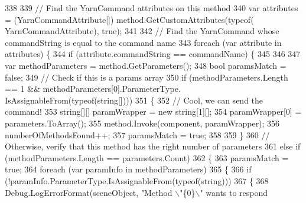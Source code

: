\begin{DoxyCode}
338 
339                     \textcolor{comment}{// Find the YarnCommand attributes on this method}
340                     var attributes = (YarnCommandAttribute[]) method.GetCustomAttributes(typeof(
      YarnCommandAttribute), \textcolor{keyword}{true});
341 
342                     \textcolor{comment}{// Find the YarnCommand whose commandString is equal to the command name}
343                     \textcolor{keywordflow}{foreach} (var attribute \textcolor{keywordflow}{in} attributes) \{
344                         \textcolor{keywordflow}{if} (attribute.commandString == commandName) \{
345 
346                             
347                             var methodParameters = method.GetParameters();
348                             \textcolor{keywordtype}{bool} paramsMatch = \textcolor{keyword}{false};
349                             \textcolor{comment}{// Check if this is a params array}
350                             \textcolor{keywordflow}{if} (methodParameters.Length == 1 && methodParameters[0].ParameterType.
      IsAssignableFrom(typeof(\textcolor{keywordtype}{string}[])))
351                                 \{
352                                     \textcolor{comment}{// Cool, we can send the command!}
353                                     \textcolor{keywordtype}{string}[][] paramWrapper = \textcolor{keyword}{new} \textcolor{keywordtype}{string}[1][];
354                                     paramWrapper[0] = parameters.ToArray();
355                                     method.Invoke(component, paramWrapper);
356                                     numberOfMethodsFound++;
357                                     paramsMatch = \textcolor{keyword}{true};
358                                 
359                             \}
360                             \textcolor{comment}{// Otherwise, verify that this method has the right number of parameters}
361                             \textcolor{keywordflow}{else} \textcolor{keywordflow}{if} (methodParameters.Length == parameters.Count)
362                             \{
363                                 paramsMatch = \textcolor{keyword}{true};
364                                 \textcolor{keywordflow}{foreach} (var paramInfo \textcolor{keywordflow}{in} methodParameters)
365                                 \{
366                                     \textcolor{keywordflow}{if} (!paramInfo.ParameterType.IsAssignableFrom(typeof(\textcolor{keywordtype}{string})))
367                                     \{
368                                         Debug.LogErrorFormat(sceneObject, \textcolor{stringliteral}{"Method \(\backslash\)"\{0\}\(\backslash\)" wants to respond
}
\end{DoxyCode}
